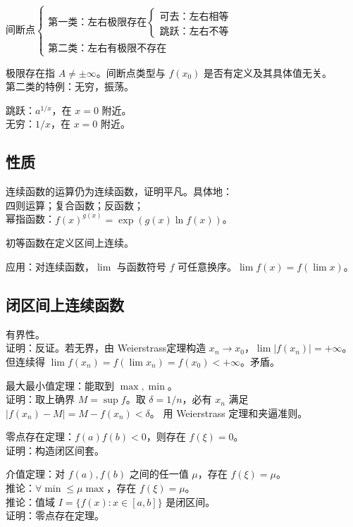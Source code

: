 \documentclass[12pt, a4paper, UTF8, openany]{ctexbook}
\begin{document}
        $\text{间断点}
        \begin{cases}
            \text{第一类：左右极限存在}
            \begin{cases}
                \text{可去：左右相等}\\
                \text{跳跃：左右不等}
            \end{cases}\\
            \text{第二类：左右有极限不存在}
        \end{cases}$

        极限存在指 $A \neq \pm\infty$。间断点类型与 $f(x_0)$ 是否有定义及其具体值无关。\\
        第二类的特例：无穷，振荡。

        跳跃：$a^{1/x}$，在 $x = 0$ 附近。\\
        无穷：$1/x$，在 $x = 0$ 附近。

        \subsection{性质}
        连续函数的运算仍为连续函数，证明平凡。具体地：\\
        四则运算；复合函数；反函数；\\
        幂指函数：$f(x)^{g(x)} = \exp(g(x)\ln f(x))$。

        初等函数在定义区间上连续。

        {\heiti 应用}：对连续函数，$\lim$ 与函数符号 $f$ 可任意换序。$\lim f(x) = f(\lim x)$。

        \subsection{闭区间上连续函数}
        有界性。\\
        证明：反证。若无界，由 Weierstrass定理构造 $x_n \to x_0$，$\lim |f(x_n)| = +\infty$。
        但连续得 $\lim f(x_n) = f(\lim x_n) = f(x_0) < +\infty$。矛盾。

        最大最小值定理：能取到 $\max, \min$。\\
        证明：取上确界 $M = \sup f$。取 $\delta = 1/n$，必有 $x_n$ 满足 $|f(x_n) - M| = M - f(x_n) < \delta$。
        用 Weierstrass 定理和夹逼准则。

        零点存在定理：$f(a)f(b) < 0$，则存在 $f(\xi) = 0$。\\
        证明：构造闭区间套。

        介值定理：对 $f(a), f(b)$ 之间的任一值 $\mu$，存在 $f(\xi) = \mu$。\\
        推论：$\forall \min \leqslant \mu \max$，存在 $f(\xi) = \mu$。\\
        推论：值域 $I = \{f(x): x \in [a, b]\}$ 是闭区间。\\
        证明：零点存在定理。
\end{document}
